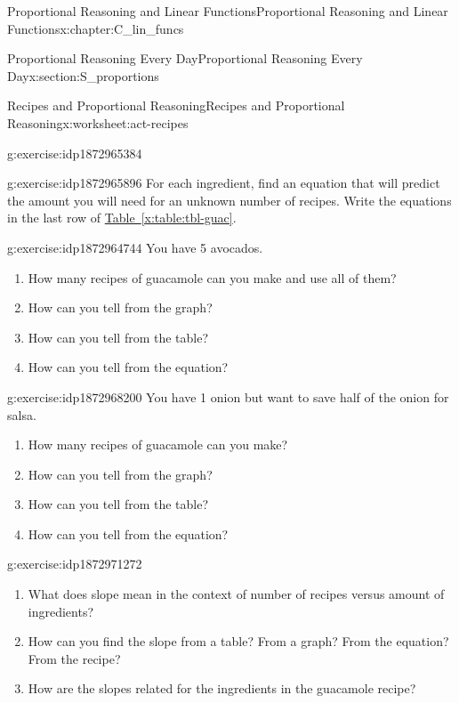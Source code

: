 \documentclass[oneside,10pt,]{book}
\newcommand{\xreffont}{\relax}
\numberwithin{equation}{chapter}
\begin{document}
\begin{chapterptx}{Proportional Reasoning and Linear Functions}{}{Proportional Reasoning and Linear Functions}{}{}{x:chapter:C_lin_funcs}
\begin{sectionptx}{Proportional Reasoning Every Day}{}{Proportional Reasoning Every Day}{}{}{x:section:S_proportions}
\begin{worksheet-subsection}{Recipes and Proportional Reasoning}{}{Recipes and Proportional Reasoning}{}{}{x:worksheet:act-recipes}
\begin{divisionexercise}{5}{}{}{g:exercise:idp1872965384}
\end{divisionexercise}%
\begin{divisionexercise}{6}{}{}{g:exercise:idp1872965896}%
For each ingredient, find an equation that will predict the amount you will need for an unknown number of recipes. Write the equations in the last row of \hyperref[x:table:tbl-guac]{Table~{\xreffont\ref{x:table:tbl-guac}}}.%
\end{divisionexercise}%
\begin{divisionexercise}{7}{}{}{g:exercise:idp1872964744}%
You have 5 avocados.%
\begin{enumerate}[font=\bfseries,label=(\alph*),ref=\alph*]
\item{}How many recipes of guacamole can you make and use all of them?%
\item{}How can you tell from the graph?%
\item{}How can you tell from the table?%
\item{}How can you tell from the equation?%
\end{enumerate}
\end{divisionexercise}%
\begin{divisionexercise}{8}{}{}{g:exercise:idp1872968200}%
You have 1 onion but want to save half of the onion for salsa.%
\begin{enumerate}[font=\bfseries,label=(\alph*),ref=\alph*]
\item{}How many recipes of guacamole can you make?%
\item{}How can you tell from the graph?%
\item{}How can you tell from the table?%
\item{}How can you tell from the equation?%
\end{enumerate}
\end{divisionexercise}%
\begin{divisionexercise}{9}{}{}{g:exercise:idp1872971272}%
\begin{enumerate}[font=\bfseries,label=(\alph*),ref=\alph*]
\item{}What does slope mean in the context of number of recipes versus amount of ingredients?%
\item{}How can you find the slope from a table? From a graph? From the equation? From the recipe?%
\item{}How are the slopes related for the ingredients in the guacamole recipe?%
\end{enumerate}
\end{divisionexercise}%
\end{worksheet-subsection}

\end{sectionptx}
\end{chapterptx}
\end{document}
